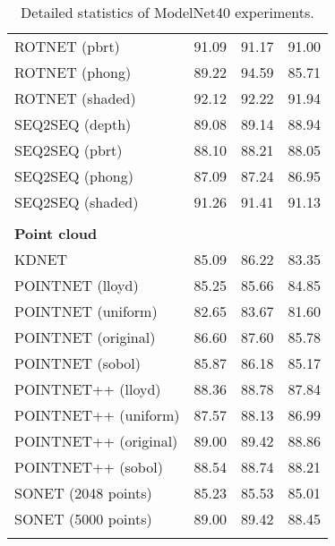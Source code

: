\begin{table}[]
\begin{tabular}{lccc}
	    	ROTNET (pbrt)          &     91.09     &    91.17     &    91.00     \\
	    	ROTNET (phong)         &     89.22     &    94.59     &    85.71     \\
	    	ROTNET (shaded)        &     92.12     &    92.22     &    91.94     \\
	    	SEQ2SEQ (depth)        &     89.08     &    89.14     &    88.94     \\
	    	SEQ2SEQ (pbrt)         &     88.10     &    88.21     &    88.05     \\
	    	SEQ2SEQ (phong)        &     87.09     &    87.24     &    86.95     \\
	    	SEQ2SEQ (shaded)       &     91.26     &    91.41     &    91.13     \\
	    	                       &               &              &              \\
	    	\textbf{Point cloud  } &               &              &              \\
	    	KDNET                  &     85.09     &    86.22     &    83.35     \\
	    	POINTNET (lloyd)       &     85.25     &    85.66     &    84.85     \\
	    	POINTNET (uniform)     &     82.65     &    83.67     &    81.60     \\
	    	POINTNET (original)    &     86.60     &    87.60     &    85.78     \\
	    	POINTNET (sobol)       &     85.87     &    86.18     &    85.17     \\
	    	POINTNET++ (lloyd)     &     88.36     &    88.78     &    87.84     \\
	    	POINTNET++ (uniform)   &     87.57     &    88.13     &    86.99     \\
	    	POINTNET++ (original)   &     89.00     &    89.42     &    88.86     \\
	    	POINTNET++ (sobol)     &     88.54     &    88.74     &    88.21     \\
	    	SONET (2048 points)    &     85.23     &    85.53     &    85.01     \\
	    	SONET (5000 points)    &     89.00     &    89.42     &    88.45     \\  
	    		    	                       &               &              &              \\ \hline
	    \end{tabular}
\caption{Detailed statistics of ModelNet40 experiments.}
\label{Table:details}
\end{table}
